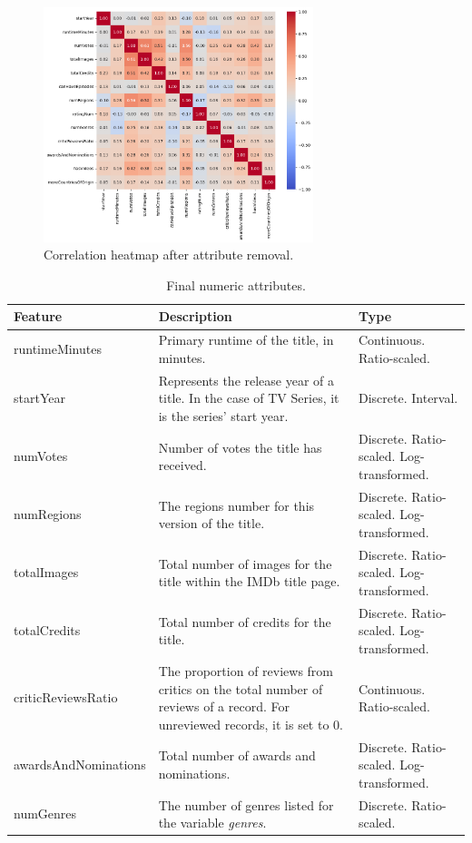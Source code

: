\begin{figure}
    \centering
    \includegraphics[width=0.7\textwidth]{../results/images/heatmap_second.png}
    \caption{Correlation heatmap after attribute removal.}
    \label{fig:heatmap_second.png}
\end{figure}

\begin{table}[h]
    \centering
    \renewcommand{\arraystretch}{1.2}
    \scriptsize
    \begin{tabular}{|p{3cm}|p{6cm}|p{3cm}|}
    \hline
    \textbf{Feature} & \textbf{Description} & \textbf{Type} \\ \hline
    runtimeMinutes & Primary runtime of the title, in minutes. & Continuous. Ratio-scaled. \\ \hline
    startYear & Represents the release year of a title. In the case of TV Series, it is the series’ start year. & Discrete. Interval. \\ \hline
    numVotes & Number of votes the title has received. & Discrete. Ratio-scaled. Log-transformed. \\ \hline
    numRegions & The regions number for this version of the title. & Discrete. Ratio-scaled. Log-transformed. \\ \hline
    totalImages & Total number of images for the title within the IMDb title page. & Discrete. Ratio-scaled. Log-transformed. \\ \hline
    totalCredits & Total number of credits for the title. & Discrete. Ratio-scaled. Log-transformed. \\ \hline
    criticReviewsRatio & The proportion of reviews from critics on the total number of reviews of a record. For unreviewed records, it is set to 0. & Continuous. Ratio-scaled. \\ \hline
    awardsAndNominations & Total number of awards and nominations. & Discrete. Ratio-scaled. Log-transformed. \\ \hline
    numGenres & The number of genres listed for the variable \textit{genres}. & Discrete. Ratio-scaled. \\ \hline
    \end{tabular}
    \caption{Final numeric attributes.}
    \label{tab:dataset_numeric}
\end{table}



